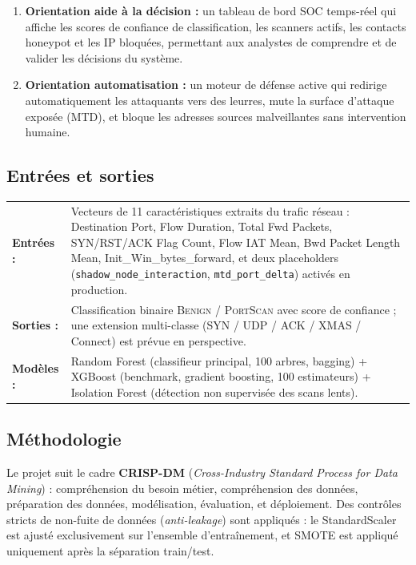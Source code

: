 \documentclass[12pt,a4paper]{article}
\begin{document}
\begin{enumerate}
  \item \textbf{Orientation aide \`{a} la d\'{e}cision :}
        un tableau de bord SOC temps-r\'{e}el qui affiche les scores de confiance
        de classification, les scanners actifs, les contacts honeypot et les IP bloqu\'{e}es,
        permettant aux analystes de comprendre et de valider les d\'{e}cisions du syst\`{e}me.
  \item \textbf{Orientation automatisation :}
        un moteur de d\'{e}fense active qui redirige automatiquement les attaquants vers des
        leurres, mute la surface d'attaque expos\'{e}e (MTD), et bloque les adresses sources
        malveillantes sans intervention humaine.
\end{enumerate}

\subsection{Entr\'{e}es et sorties}

\begin{tabular}{@{}l@{\hspace{1em}}p{11cm}@{}}
  \textbf{Entr\'{e}es :}
    & Vecteurs de 11 caract\'{e}ristiques extraits du trafic r\'{e}seau :
      Destination Port, Flow Duration, Total Fwd Packets, SYN/RST/ACK Flag Count,
      Flow IAT Mean, Bwd Packet Length Mean, Init\_Win\_bytes\_forward,
      et deux placeholders (\texttt{shadow\_node\_interaction},
      \texttt{mtd\_port\_delta}) activ\'{e}s en production. \\[0.5em]
  \textbf{Sorties :}
    & Classification binaire \textsc{Benign} / \textsc{PortScan} avec score de
      confiance ; une extension multi-classe (SYN / UDP / ACK / XMAS / Connect)
      est pr\'{e}vue en perspective. \\[0.5em]
  \textbf{Mod\`{e}les :}
    & Random Forest (classifieur principal, 100 arbres, bagging)
      + XGBoost (benchmark, gradient boosting, 100 estimateurs)
      + Isolation Forest (d\'{e}tection non supervis\'{e}e des scans lents).
\end{tabular}

\subsection{M\'{e}thodologie}

Le projet suit le cadre \textbf{CRISP-DM} (\textit{Cross-Industry Standard Process for
Data Mining}) : compr\'{e}hension du besoin m\'{e}tier, compr\'{e}hension des donn\'{e}es,
pr\'{e}paration des donn\'{e}es, mod\'{e}lisation, \'{e}valuation, et d\'{e}ploiement.
Des contr\^{o}les stricts de non-fuite de donn\'{e}es (\textit{anti-leakage}) sont
appliqu\'{e}s : le StandardScaler est ajust\'{e} exclusivement sur l'ensemble
d'entra\^{i}nement, et SMOTE est appliqu\'{e} uniquement apr\`{e}s la s\'{e}paration
train/test.
\end{document}
